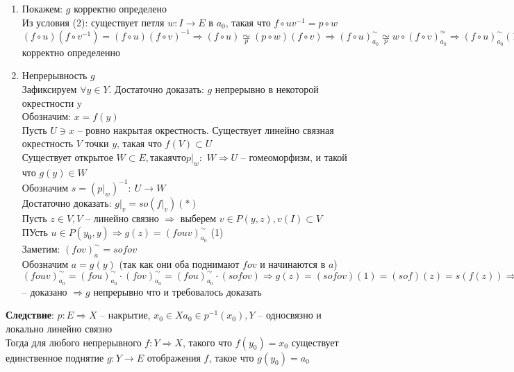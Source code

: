 	\begin{enumerate}
	\item Покажем: $g$ корректно определено\\
		Из условия (2): существует петля $w: I\rightarrow E$ в $a_0$, такая что $f \circ uv^{-1} = p \circ w$\\
		$(f \circ u)(f \circ v^{-1}) = (f \circ u)(f \circ v)^{-1} \Rightarrow (f \circ u) \underset{p}{\simeq} (p \circ w)(f \circ v) \Rightarrow (f \circ u)_{a_0}^{\sim} \underset{p}{\simeq} w \circ (f \circ v)_{a_0}^{\simeq} \Rightarrow (f \circ u)_{a_0}^{\sim} (1) = (f \circ v)_{a_0}^{\sim} (1) \Rightarrow g$ корректно определенно
	\item Непрерывность $g$\\
		Зафиксируем $\forall y\in Y$. Достаточно доказать: $g$ непрерывно в некоторой окрестности y\\
		Обозначим: $x = f(y)$\\
		Пусть $U\ni x$ -- ровно накрытая окрестность. Существует линейно связная окрестность $V$ точки $y$, такая что $f(V)\subset U$\\
		Существует открытое $W\subset E, такая что {p|}_w$:\ $W\Rightarrow U$ -- гомеоморфизм, и такой что $g(y) \in W$\\
		Обозначим $s = ({p|}_w)^{-1}:\ U \rightarrow W$\\
		Достаточно доказать: ${g|}_v = so({f|}_v) (*)$\\
		Пусть $z\in V, V$ -- линейно связно $\Rightarrow$ выберем $v\in P(y,z), v(I) \subset V$\\
		ПУсть $u\in P(y_0,y) \Rightarrow g(z) = (fouv)_{a_0}^{\sim}$ (1)\\
		Заметим: $(fov)_{a}^{\sim} = sofov$\\
		Обозначим $a = g(y)$ (так как они оба поднимают $fov$ и начинаются в $a$)\\
		$(fouv)_{a_0}^{\sim} = (fou)_{a_0}^{\sim} \cdot (fov)_{a_0}^{\sim} = (fou)_{a_0}^{\sim} \cdot (sofov) \Rightarrow g(z) = (sofov) (1) = (sof)(z) = s(f(z)) \Rightarrow (*)$ -- доказано $\Rightarrow g$ непрерывно что и требовалось доказать
	\end{enumerate}
	\textbf{Следствие}: $p: E\Rightarrow X$ -- накрытие, $x_0 \in X a_0 \in p^{-1} (x_0), Y$ -- односвязно и локально линейно связно\\
	Тогда для любого непрерывного $f: Y \Rightarrow X$, такого что $f(y_0) = x_0$ существует единственное поднятие $g: Y \rightarrow E$ отображения $f$, такое что $g(y_0) = a_0$
	


